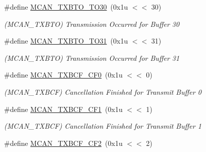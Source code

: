 \begin{DoxyCompactItemize}
\mbox{\label{group__SAMV71__MCAN_gaa8694b01b9cd5c5680278d30bfb21eaf}} 
\#define \mbox{\hyperlink{group__SAMV71__MCAN_gaa8694b01b9cd5c5680278d30bfb21eaf}{M\+C\+A\+N\+\_\+\+T\+X\+B\+T\+O\+\_\+\+T\+O30}}~(0x1u $<$$<$ 30)
\begin{DoxyCompactList}\small\item\em (M\+C\+A\+N\+\_\+\+T\+X\+B\+TO) Transmission Occurred for Buffer 30 \end{DoxyCompactList}\item 
\mbox{\label{group__SAMV71__MCAN_ga470e73b34bf17c9861147ec9f65afa25}} 
\#define \mbox{\hyperlink{group__SAMV71__MCAN_ga470e73b34bf17c9861147ec9f65afa25}{M\+C\+A\+N\+\_\+\+T\+X\+B\+T\+O\+\_\+\+T\+O31}}~(0x1u $<$$<$ 31)
\begin{DoxyCompactList}\small\item\em (M\+C\+A\+N\+\_\+\+T\+X\+B\+TO) Transmission Occurred for Buffer 31 \end{DoxyCompactList}\item 
\mbox{\label{group__SAMV71__MCAN_ga6be17d6e8081aeb8244946ffe170c23e}} 
\#define \mbox{\hyperlink{group__SAMV71__MCAN_ga6be17d6e8081aeb8244946ffe170c23e}{M\+C\+A\+N\+\_\+\+T\+X\+B\+C\+F\+\_\+\+C\+F0}}~(0x1u $<$$<$ 0)
\begin{DoxyCompactList}\small\item\em (M\+C\+A\+N\+\_\+\+T\+X\+B\+CF) Cancellation Finished for Transmit Buffer 0 \end{DoxyCompactList}\item 
\mbox{\label{group__SAMV71__MCAN_gaecbe95022c50ad8e54d0f206105146c5}} 
\#define \mbox{\hyperlink{group__SAMV71__MCAN_gaecbe95022c50ad8e54d0f206105146c5}{M\+C\+A\+N\+\_\+\+T\+X\+B\+C\+F\+\_\+\+C\+F1}}~(0x1u $<$$<$ 1)
\begin{DoxyCompactList}\small\item\em (M\+C\+A\+N\+\_\+\+T\+X\+B\+CF) Cancellation Finished for Transmit Buffer 1 \end{DoxyCompactList}\item 
\mbox{\label{group__SAMV71__MCAN_gae8b8a60df1b786b077b9dc74b6fc7f5f}} 
\#define \mbox{\hyperlink{group__SAMV71__MCAN_gae8b8a60df1b786b077b9dc74b6fc7f5f}{M\+C\+A\+N\+\_\+\+T\+X\+B\+C\+F\+\_\+\+C\+F2}}~(0x1u $<$$<$ 2)
$$
\end{DoxyCompactItemize}
